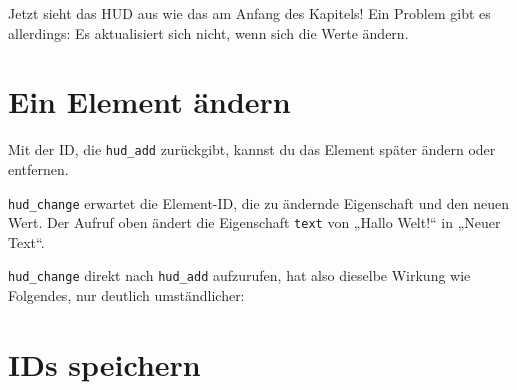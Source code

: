 Jetzt sieht das HUD aus wie das am Anfang des Kapitels! Ein Problem gibt
es allerdings: Es aktualisiert sich nicht, wenn sich die Werte ändern.

\section{Ein Element ändern}\label{ein-element-uxe4ndern}

Mit der ID, die \texttt{hud\_\allowbreak{}add} zurückgibt, kannst du das
Element später ändern oder entfernen.

\begin{Shaded}
\begin{Highlighting}[]
  \OperatorTok{=} \OperatorTok{:}\OperatorTok{(\{}
     \OperatorTok{=} \OperatorTok{,}
     \OperatorTok{=} \OperatorTok{,}
\OperatorTok{\})}

\OperatorTok{:}\OperatorTok{(}\OperatorTok{,} \OperatorTok{,} \OperatorTok{)}
\OperatorTok{:}\OperatorTok{(}\OperatorTok{)}
\end{Highlighting}
\end{Shaded}

\texttt{hud\_\allowbreak{}change} erwartet die Element-ID, die zu
ändernde Eigenschaft und den neuen Wert. Der Aufruf oben ändert die
Eigenschaft \texttt{text} von „Hallo Welt!{\kern0pt}`` in „Neuer Text``.

\texttt{hud\_\allowbreak{}change} direkt nach
\texttt{hud\_\allowbreak{}add} aufzurufen, hat also dieselbe Wirkung wie
Folgendes, nur deutlich umständlicher:

\begin{Shaded}
\begin{Highlighting}[]
  \OperatorTok{=} \OperatorTok{:}\OperatorTok{(\{}
     \OperatorTok{=} \OperatorTok{,}
     \OperatorTok{=} \OperatorTok{,}
\OperatorTok{\})}
\end{Highlighting}
\end{Shaded}

\section{IDs speichern}\label{ids-speichern}


